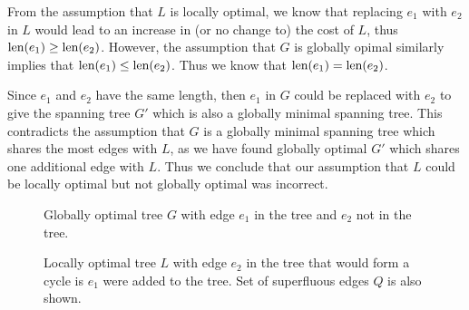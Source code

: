 \documentclass[11pt, a4paper]{article}
\begin{document}
From the assumption that $L$ is locally optimal,
we know that replacing $e_1$ with $e_2$ in $L$ would lead to an increase in (or no change to) the
cost of $L$, thus $\text{len}(e_1) \geq \text{len}(e_2)$. However, the assumption that $G$ is globally opimal
similarly implies that $\text{len}(e_1) \leq \text{len}(e_2)$. Thus we know that $\text{len}(e_1) = \text{len}(e_2)$. 

Since $e_1$ and $e_2$ have the same length, then $e_1$ in $G$ could be replaced with $e_2$ to give
the spanning tree $G'$ which is also a globally minimal spanning tree. This contradicts the
assumption that $G$ is a globally minimal spanning tree which shares the most edges with $L$, as we
have found globally optimal $G'$ which shares one additional edge with $L$. Thus we conclude that
our assumption that $L$ could be locally optimal but not globally optimal was incorrect.



\begin{figure}[!h]
\centering
{}
    \caption{Globally optimal tree $G$ with edge $e_1$ in the tree and $e_2$ not in the tree.}
    \label{fig:g}

    \caption{Locally optimal tree $L$ with edge $e_2$ in the tree that would form a cycle is $e_1$
    were added to the tree.  Set of superfluous edges $Q$ is also shown.}
    \label{fig:l}
\end{figure}
\end{document}
